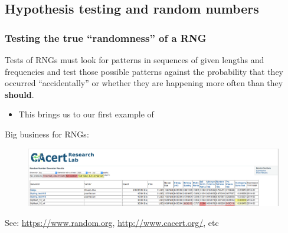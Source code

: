 \documentclass[hyperref={colorlinks=true}]{beamer}
\begin{document}
\subsection[Hypothesis testing and random numbers]{Hypothesis testing and random numbers}

\begin{frame}[fragile]%
  \frametitle{Testing the true ``randomness'' of a RNG}
  
  Tests of RNGs must look for patterns in sequences of given lengths and frequencies and test those possible patterns against the probability that they occurred ``accidentally'' or whether they are happening more often than they \textbf{should}.
  
  \begin{itemize}
    \item[\ra] This brings us to our first example of 
  \end{itemize}
  
  Big business for RNGs:
  
  \begin{figure}
    \includegraphics[width=\textwidth]{RandomnessTests.png}
  \end{figure}  
  
  See: \url{https://www.random.org}, \url{http://www.cacert.org/}, etc
  
\end{frame}

\end{document}
